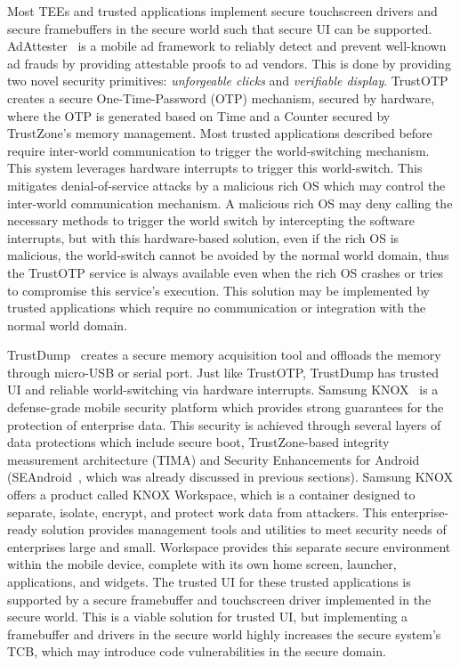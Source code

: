 Most TEEs and trusted applications implement secure touchscreen drivers and secure framebuffers in the secure world such that secure UI can be supported. AdAttester~\cite{li2015adattester} is a mobile ad framework to reliably detect and prevent well-known ad frauds by providing attestable proofs to ad vendors. This is done by providing two novel security primitives: \emph{unforgeable clicks} and \emph{verifiable display}. %
TrustOTP~\cite{sun2015trustotp} creates a secure One-Time-Password (OTP) mechanism, secured by hardware, where the OTP is generated based on Time and a Counter secured by TrustZone's memory management. Most trusted applications described before require inter-world communication to trigger the world-switching mechanism. This system leverages hardware interrupts to trigger this world-switch. This mitigates denial-of-service attacks by a malicious rich OS which may control the inter-world communication mechanism. A malicious rich OS may deny calling the necessary methods to trigger the world switch by intercepting the software interrupts, but with this hardware-based solution, even if the rich OS is malicious, the world-switch cannot be avoided by the normal world domain, thus the TrustOTP service is always available even when the rich OS crashes or tries to compromise this service's execution. This solution may be implemented by trusted applications which require no communication or integration with the normal world domain. %

TrustDump~\cite{sun2015reliable} creates a secure memory acquisition tool and offloads the memory through micro-USB or serial port. Just like TrustOTP, TrustDump has trusted UI and reliable world-switching via hardware interrupts. Samsung KNOX~\cite{knox_whitepaper} is a defense-grade mobile security platform which provides strong guarantees for the protection of enterprise data. This security is achieved through several layers of data protections which include secure boot, TrustZone-based integrity measurement architecture (TIMA) and Security Enhancements for Android (SEAndroid~\cite{smalley2013security}, which was already discussed in previous sections). Samsung KNOX offers a product called KNOX Workspace, which is a container designed to separate, isolate, encrypt, and protect work data from attackers. This enterprise-ready solution provides management tools and utilities to meet security needs of enterprises large and small. Workspace provides this separate secure environment within the mobile device, complete with its own home screen, launcher, applications, and widgets. %
The trusted UI for these trusted applications is supported by a secure framebuffer and touchscreen driver implemented in the secure world. This is a viable solution for trusted UI, but implementing a framebuffer and drivers in the secure world highly increases the secure system's TCB, which may introduce code vulnerabilities in the secure domain.

